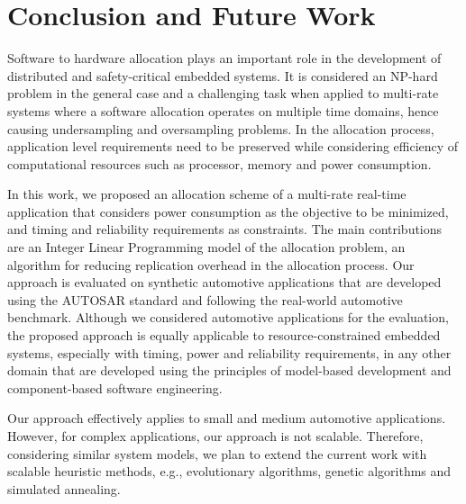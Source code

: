 \section{Conclusion and Future Work}\label{sec_conclusion}
Software to hardware allocation plays an important role in the development of distributed and safety-critical embedded systems. It is considered an NP-hard problem in the general case and a challenging task when applied to multi-rate systems where a software allocation operates on multiple time domains, hence causing undersampling and oversampling problems. In the allocation process, application level requirements need to be preserved while considering efficiency of computational resources such as processor, memory and power consumption.

In this work, we proposed an allocation scheme of a multi-rate real-time application that considers power consumption as the objective to be minimized, and timing and reliability requirements as constraints. The main contributions are an Integer Linear Programming model of the allocation problem, an algorithm for reducing replication overhead in the allocation process. Our approach is evaluated on synthetic automotive applications that are developed using the AUTOSAR standard and following the real-world automotive benchmark. Although we considered automotive applications for the evaluation, the proposed approach is equally applicable to resource-constrained embedded systems, especially with timing, power and reliability requirements, in any other domain that are developed using the principles of model-based development and component-based software engineering.

Our approach effectively applies to small and medium automotive applications. However, for complex applications, our approach is not scalable. Therefore, considering similar system models, we plan to extend the current work with scalable heuristic methods, e.g., evolutionary algorithms, genetic algorithms and simulated annealing.